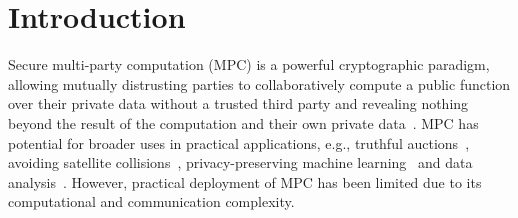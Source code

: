 
\section{Introduction}




Secure multi-party computation (MPC) is a powerful cryptographic paradigm, allowing mutually distrusting parties to collaboratively compute a public function over their private data without
a trusted third party and revealing nothing beyond the result of the computation and their own private data~\cite{Yao86,ChaumCD88,GMW,yao82,EvansKR18}.
MPC has potential for broader uses in practical applications, e.g., truthful auctions~\cite{BogetoftDJNPT06}, avoiding satellite collisions~\cite{HemenwayLOW16},
privacy-preserving machine learning~\cite{secureml,securenn} and data analysis~\cite{securedata}.
%
However, practical deployment of MPC has been limited due to its computational and communication complexity.

